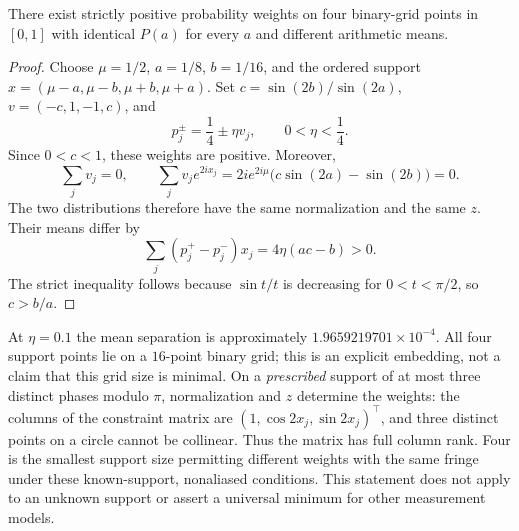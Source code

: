 \begin{proposition}
\label{prop:nonidentifiable}
There exist strictly positive probability weights on four binary-grid
points in $[0,1]$ with identical $P(a)$ for every $a$ and different
arithmetic means.
\end{proposition}

\begin{proof}
Choose $\mu=1/2$, $a=1/8$, $b=1/16$, and the ordered support
$x=(\mu-a,\mu-b,\mu+b,\mu+a)$.
Set $c=\sin(2b)/\sin(2a)$, $v=(-c,1,-1,c)$, and
\begin{equation}
 p_j^{\pm}=\frac14\pm\eta v_j,\qquad 0<\eta<\frac14.
 \label{eq:four-point-weights}
\end{equation}
Since $0<c<1$, these weights are positive. Moreover,
\begin{equation}
 \sum_jv_j=0,\qquad
 \sum_jv_je^{2ix_j}=2ie^{2i\mu}
       \bigl(c\sin(2a)-\sin(2b)\bigr)=0.
 \label{eq:four-point-null}
\end{equation}
The two distributions therefore have the same normalization and the
same $z$. Their means differ by
\begin{equation}
 \sum_j(p_j^+-p_j^-)x_j=4\eta(ac-b)>0.
 \label{eq:four-point-means}
\end{equation}
The strict inequality follows because $\sin t/t$ is decreasing for
$0<t<\pi/2$, so $c>b/a$.
\end{proof}

At $\eta=0.1$ the mean separation is approximately
$1.9659219701\times10^{-4}$. All four support points lie on a
$16$-point binary grid; this is an explicit embedding, not a claim that
this grid size is minimal. On a \emph{prescribed} support of at most three
distinct phases modulo $\pi$, normalization and $z$ determine the weights:
the columns of the constraint matrix are
$(1,\cos2x_j,\sin2x_j)^\top$, and three distinct points on a circle cannot
be collinear. Thus the matrix has full column rank. Four is the smallest
support size permitting different weights with the same fringe under
these known-support, nonaliased conditions. This statement does not apply
to an unknown support or assert a universal minimum for other
measurement models.

